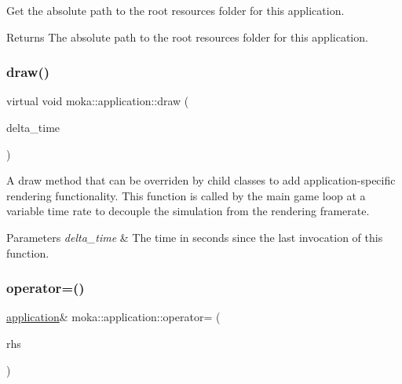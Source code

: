 Get the absolute path to the root resources folder for this application. 

\begin{DoxyReturn}{Returns}
The absolute path to the root resources folder for this application. 
\end{DoxyReturn}
\mbox{\label{classmoka_1_1application_a4ff779dd96996fa04cc391547b972519}} 
\subsubsection{\texorpdfstring{draw()}{draw()}}
{\footnotesize\ttfamily virtual void moka\+::application\+::draw (\begin{DoxyParamCaption}\item[{\mbox{\hyperlink{namespacemoka_a4b8e94fbfa287169990f1cc8171c0984}{game\+\_\+time}}}]{delta\+\_\+time }\end{DoxyParamCaption})\hspace{0.3cm}{\ttfamily [pure virtual]}}



A draw method that can be overriden by child classes to add application-\/specific rendering functionality. This function is called by the main game loop at a variable time rate to decouple the simulation from the rendering framerate. 


\begin{DoxyParams}{Parameters}
{\em delta\+\_\+time} & The time in seconds since the last invocation of this function. \\
\hline
\end{DoxyParams}
\mbox{\label{classmoka_1_1application_ad885d2917244949203f76c66719ce184}} 
\subsubsection{\texorpdfstring{operator=()}{operator=()}\hspace{0.1cm}{\footnotesize\ttfamily [1/2]}}
{\footnotesize\ttfamily \mbox{\hyperlink{classmoka_1_1application}{application}}\& moka\+::application\+::operator= (\begin{DoxyParamCaption}\item[{const \mbox{\hyperlink{classmoka_1_1application}{application}} \&}]{rhs }\end{DoxyParamCaption})\hspace{0.3cm}{\ttfamily [delete]}}

